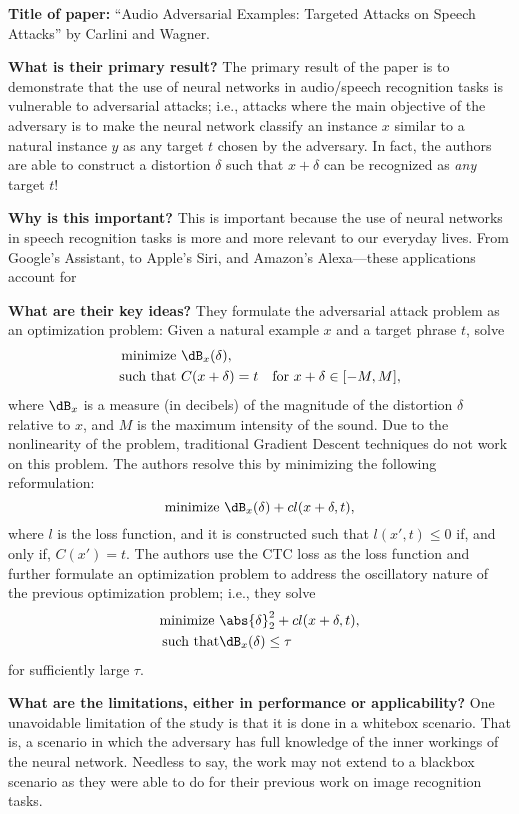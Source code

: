 \noindent \textbf{Title of paper:} ``Audio Adversarial Examples: Targeted
Attacks on Speech Attacks'' by Carlini and Wagner.

\noindent\textbf{What is their primary result?} The primary result of the
paper is to demonstrate that the use of neural networks in audio/speech
recognition tasks is vulnerable to adversarial attacks; i.e., attacks where the
main objective of the adversary is to make the neural network classify an
instance $x$ similar to a natural instance $y$ as any target $t$ chosen by the
adversary. In fact, the authors are able to construct a distortion $\delta$ such
that $x+\delta$ can be recognized as \emph{any} target $t$!

\noindent\textbf{Why is this important?} This is important because the use of
neural networks in speech recognition tasks is more and more relevant to our
everyday lives. From Google's Assistant, to Apple's Siri, and Amazon's
Alexa---these applications account for

\noindent\textbf{What are their key ideas?} They formulate the adversarial
attack problem as an optimization problem: Given a natural example $x$ and a
target phrase $t$, solve
\[
  \begin{aligned}
    \text{minimize }
    &\dB_x(\delta),\\
    \text{such that }&C(x+\delta)=t\quad \text{for } x+\delta\in [-M,M],
  \end{aligned}
\]
where $\dB_x$ is a measure (in decibels) of the magnitude of the
distortion $\delta$ relative to $x$, and $M$ is the maximum intensity of the
sound. Due to the nonlinearity of the problem, traditional Gradient Descent
techniques do not work on this problem. The authors resolve this by minimizing
the following reformulation:
\[
  \text{minimize }\dB_x(\delta)+cl(x+\delta,t),
\]
where $l$ is the loss function, and it is constructed such that $l(x',t)\leq 0$
if, and only if, $C(x')=t$. The authors use the CTC loss as the loss function
and further formulate an optimization problem to address the oscillatory nature
of the previous optimization problem; i.e., they solve
\begin{align*}
  \text{minimize }  &\abs{\delta}_2^2+cl(x+\delta,t),\\
  \text{such that}&\dB_x(\delta)\leq\tau
\end{align*}
for sufficiently large $\tau$.

\noindent\textbf{What are the limitations, either in performance or
  applicability?} One unavoidable limitation of the study is that it is done in
a whitebox scenario. That is, a scenario in which the adversary has full
knowledge of the inner workings of the neural network. Needless to say, the work
may not extend to a blackbox scenario as they were able to do for their previous
work on image recognition tasks.

